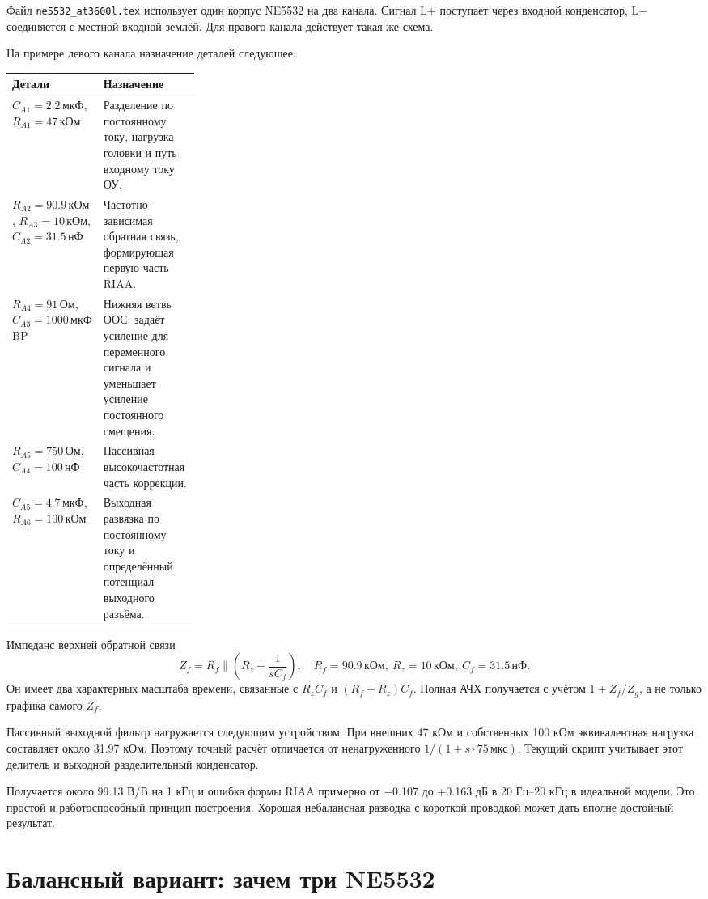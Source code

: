 \documentclass[a4paper,11pt]{article}
\newcommand{\Ohm}{\,\text{Ом}}
\newcommand{\kOhm}{\,\text{кОм}}
\newcommand{\uF}{\,\text{мкФ}}
\newcommand{\nF}{\,\text{нФ}}
\newcommand{\mkS}{\,\text{мкс}}
\newcommand{\file}[1]{\nolinkurl{#1}}
\begin{document}
Файл \file{ne5532_at3600l.tex} использует один корпус NE5532 на два канала.
Сигнал L+ поступает через входной конденсатор, L− соединяется с местной входной
землёй. Для правого канала действует такая же схема.

На примере левого канала назначение деталей следующее:
\par
\begin{tabularx}{\linewidth}{@{}L{0.27\linewidth}Y@{}}
\toprule
Детали & Назначение\\
\midrule
$C_{A1}=2.2\uF$, $R_{A1}=47\kOhm$ & Разделение по постоянному току,
нагрузка головки и путь входному току ОУ.\\
$R_{A2}=90.9\kOhm$, $R_{A3}=10\kOhm$, $C_{A2}=31.5\nF$ &
Частотно-зависимая обратная связь, формирующая первую часть RIAA.\\
$R_{A4}=91\Ohm$, $C_{A3}=1000\uF$ BP &
Нижняя ветвь ООС: задаёт усиление для переменного сигнала и уменьшает
усиление постоянного смещения.\\
$R_{A5}=750\Ohm$, $C_{A4}=100\nF$ & Пассивная высокочастотная часть коррекции.\\
$C_{A5}=4.7\uF$, $R_{A6}=100\kOhm$ & Выходная развязка по постоянному
току и определённый потенциал выходного разъёма.\\
\bottomrule
\end{tabularx}

Импеданс верхней обратной связи
\[
 Z_f=R_f\parallel\left(R_z+\frac1{sC_f}\right),
 \quad R_f=90.9\kOhm,\ R_z=10\kOhm,\ C_f=31.5\nF.
\]
Он имеет два характерных масштаба времени, связанные с $R_zC_f$ и
$(R_f+R_z)C_f$. Полная АЧХ получается с учётом $1+Z_f/Z_g$,
а не только графика самого $Z_f$.

Пассивный выходной фильтр нагружается следующим устройством. При внешних 47 кОм
и собственных 100 кОм эквивалентная нагрузка составляет около 31.97 кОм.
Поэтому точный расчёт отличается от ненагруженного $1/(1+s\cdot75\mkS)$.
Текущий скрипт учитывает этот делитель и выходной разделительный конденсатор.

Получается около 99.13 В/В на 1 кГц и ошибка формы RIAA примерно
от −0.107 до +0.163 дБ в 20 Гц–20 кГц в идеальной модели.
Это простой и работоспособный принцип построения. Хорошая небалансная разводка
с короткой проводкой может дать вполне достойный результат.

\section{Балансный вариант: зачем три NE5532}
\end{document}
